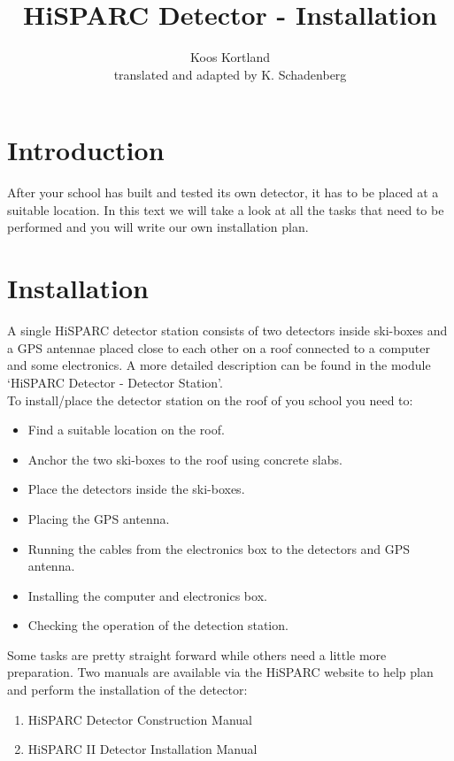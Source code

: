 


\author{Koos Kortland \\ translated and adapted by K. Schadenberg}
\date{}
\title{HiSPARC Detector - Installation}



\maketitle

\section{Introduction}
After your school has built and tested its own detector, it has to be placed at a suitable location. In this text we will take a look at all the tasks that need to be performed and you will write our own installation plan.

\section{Installation}
A single HiSPARC detector station consists of two detectors inside ski-boxes and a GPS antennae placed close to each other on a roof connected to a computer and some electronics. A more detailed description can be found in the module `HiSPARC Detector - Detector Station'.\\

To install/place the detector station on the roof of you school you need to:
\begin{itemize}
\item Find a suitable location on the roof.
\item Anchor the two ski-boxes to the roof using concrete slabs.
\item Place the detectors inside the ski-boxes.
\item Placing the GPS antenna.
\item Running the cables from the electronics box to the detectors and GPS antenna.
\item Installing the computer and electronics box.
\item Checking the operation of the detection station.
\end{itemize}

Some tasks are pretty straight forward while others need a little more preparation. Two manuals are available via the HiSPARC website to help plan and perform the installation of the detector:
\begin{enumerate}[-]
\item HiSPARC Detector Construction Manual
\item HiSPARC II Detector Installation Manual
\end{enumerate}

